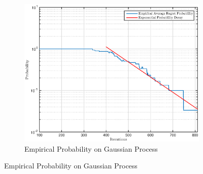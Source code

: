 \documentclass[]{article}
\newcommand{\1}{\mathbf{1}}
\newcommand{\0}{\mathbf{0}}
\begin{document}
\begin{figure}
	\centering
    \captionsetup{width=0.45\textwidth}
    \begin{subfigure}[b]{0.45\textwidth}
		\includegraphics[width=\textwidth]{images/probability_2.eps}
    	\caption{Empirical Probability on Gaussian Process}
    	\label{fig:prob-gaus}
    \end{subfigure}
    

\end{figure}
\end{document}
